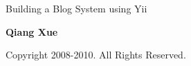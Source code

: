 
\thispagestyle{empty}
\begin{center}
    \bfseries \rule{0cm}{1.5cm} \Huge
    Building a Blog System using Yii
     \vspace{1.5cm}
\end{center}

\begin{center}
    \bfseries \Large Qiang Xue
\end{center}


\begin{center}
   Copyright 2008-2010. All Rights Reserved.
\end{center}

\vfill

\pagebreak \thispagestyle{empty} \cleardoublepage
